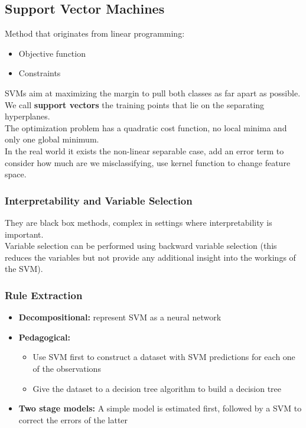     \subsection{Support Vector Machines}
        Method that originates from linear programming:
        \begin{itemize}
            \item Objective function 
            \item Constraints 
        \end{itemize}
        SVMs aim at maximizing the margin to pull both classes as far apart as possible.\\
        We call \textbf{support vectors} the training points that lie on the separating hyperplanes.\\
        The optimization problem has a quadratic cost function, no local minima and only one global minimum.\\
        In the real world it exists the non-linear separable case, add an error term to consider how much are we misclassifying, use kernel function to change feature space.
        \subsubsection{Interpretability and Variable Selection}
            They are black box methods, complex in settings where interpretability is important.\\
            Variable selection can be performed using backward variable selection (this reduces the variables but not provide any additional insight into the workings of the SVM).
        \subsubsection{Rule Extraction}
            \begin{itemize}
                \item \textbf{Decompositional:} represent SVM as a neural network
                \item \textbf{Pedagogical:} 
                \begin{itemize}
                    \item Use SVM first to construct a dataset with SVM predictions for each one of the observations
                    \item Give the dataset to a decision tree algorithm to build a decision tree
                \end{itemize}
                \item \textbf{Two stage models:} A simple model is estimated first, followed by a SVM to correct the errors of the latter
            \end{itemize}

